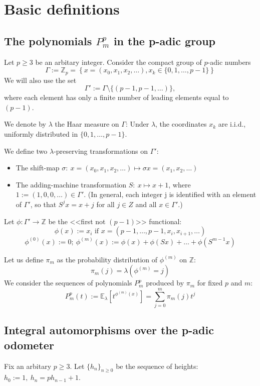 \documentclass[a4paper]{article}
\theoremstyle{plain}
\theoremstyle{definition}
\begin{document}
\section{Basic definitions}
\subsection{The polynomials $P_m^p$ in the p-adic group}
Let $p \ge 3$ be an arbitary integer.
Consider the compact group of $p$-adic numbers
$$\Gamma := \mathbb{Z}_p = \left\{x = \left(x_0, x_1, x_2, \ldots \right), x_k \in \{0, 1, \ldots, p - 1\} \right\}$$
We will also use the set
$$\Gamma' := \Gamma \setminus \{(p-1,p-1,\ldots)\},$$
where each element has only a finite number of leading elements equal to $(p-1)$.

We denote by $\lambda$ the Haar measure on $\Gamma$: Under $\lambda$, the coordinates $x_k$ are i.i.d., uniformly distributed in $\{0, 1, \ldots, p - 1\}$.

    We define two $\lambda$-preserving transformations on $\Gamma'$:
    \begin{itemize}
    \item The shift-map $\sigma:\ x=\left(x_0, x_1, x_2, \ldots \right) \mapsto \sigma x = \left(x_1, x_2, \ldots \right)$
    \item The adding-machine transformation $S:\ x \mapsto x + 1$, where $1:=(1,0,0,\ldots) \in \Gamma'$. (In general, each integer j is
identified with an element of $\Gamma'$, so that $S^jx = x + j$ for all $j \in Z$ and all
$x \in \Gamma'$.)
    \end{itemize}
    Let $\phi: \Gamma' \rightarrow \mathbb{Z}$ be the <<first not $(p-1)$>> functional:\\
    \[\phi(x):=x_i\text{ if }x=(p-1, \ldots, p-1, x_i, x_{i+1}, \ldots)\]
    \[\phi^{(0)}(x):=0;\ \phi^{(m)}(x):=\phi(x)+\phi(Sx)+\ldots+\phi(S^{m-1}x)\]

Let us define $\pi_m$ as the probability distribution of $\phi^{(m)}$ on $\mathbb{Z}$:
    \[\pi_m(j) = \lambda(\phi^{(m)}=j)\]
    We consider the sequences of polynomials $P_m^p$ produced by $\pi_m$ for fixed $p$ and $m$:
    \[P_m^p(t):= \mathbb{E}_\lambda\left[ t^{\phi^{(m)}(x)}\right] = \sum\limits_{j=0}^m \pi_m(j) t^j \]
    
\subsection{Integral automorphisms over the p-adic odometer}
Fix an arbitary $p \ge 3$. Let $\{h_n\}_{n \ge 0}$ be the sequence of heights: $h_0 := 1,\ h_n = ph_{n-1}+1$.
\end{document}
